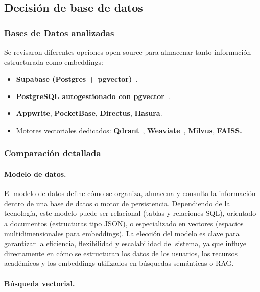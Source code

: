 \subsection{Decisión de base de datos}

\subsubsection{Bases de Datos analizadas}

Se revisaron diferentes opciones open source para almacenar tanto información estructurada como embeddings:

\begin{itemize}
    \item \textbf{Supabase (Postgres + pgvector)}~\cite{supabasedocs,pgvectorgithub}.
    \item \textbf{PostgreSQL autogestionado con pgvector}~\cite{pgvectorgithub}.
    \item \textbf{Appwrite}, \textbf{PocketBase}, \textbf{Directus}, \textbf{Hasura}.
    \item Motores vectoriales dedicados: \textbf{Qdrant}~\cite{qdrantdocs}, \textbf{Weaviate}~\cite{weaviatedocs}, \textbf{Milvus}, \textbf{FAISS.}
\end{itemize}

\subsubsection{Comparación detallada}

\paragraph{Modelo de datos.}

El modelo de datos define cómo se organiza, almacena y consulta la información dentro de una base de datos o motor de persistencia. Dependiendo de la tecnología, este modelo puede ser relacional (tablas y relaciones SQL), orientado a documentos (estructuras tipo JSON), o especializado en vectores (espacios multidimensionales para embeddings). La elección del modelo es clave para garantizar la eficiencia, flexibilidad y escalabilidad del sistema, ya que influye directamente en cómo se estructuran los datos de los usuarios, los recursos académicos y los embeddings utilizados en búsquedas semánticas o RAG.

\paragraph{Búsqueda vectorial.}

